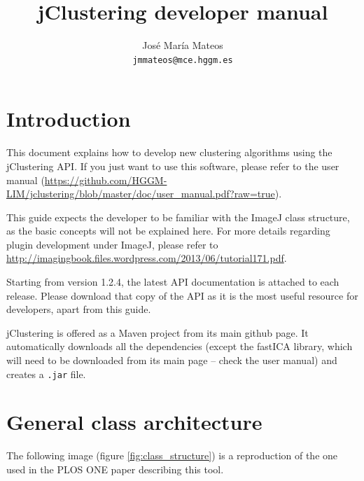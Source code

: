 \documentclass[11pt]{article} %
\title{jClustering developer manual}
\author{José María Mateos \\ \texttt{jmmateos@mce.hggm.es}}
\begin{document}
\lstset{language=Java, stringstyle=\ttfamily, basicstyle=\small, frame=single}

\maketitle

\tableofcontents

\section{Introduction}

This document explains how to develop new clustering algorithms using the jClustering API. If you just want to use this software, please refer to the user manual (\url{https://github.com/HGGM-LIM/jclustering/blob/master/doc/user_manual.pdf?raw=true}).

This guide expects the developer to be familiar with the ImageJ class structure, as the basic concepts will not be explained here.
For more details regarding plugin development under ImageJ, please refer to \url{http://imagingbook.files.wordpress.com/2013/06/tutorial171.pdf}.

Starting from version 1.2.4, the latest API documentation is attached to each release. Please download that copy of the API as it is the most useful resource for developers, apart from this guide.

jClustering is offered as a Maven project from its main github page. It automatically downloads all the dependencies (except the fastICA library, which will need to be downloaded from its main page -- check the user manual) and creates a {\tt .jar} file.

\section{General class architecture}

The following image (figure \ref{fig:class_structure}) is a reproduction of the one used in the PLOS ONE paper describing this tool.
\end{document}
